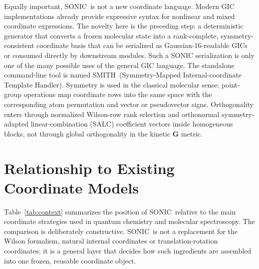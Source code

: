 \documentclass[journal=jctcce,manuscript=article,layout=traditional]{achemso}
\newcommand{\SONIC}{SONIC}
\newcommand{\SMITH}{\textsc{SMITH}}
\newcommand{\Gmat}{\mathbf{G}}
\theoremstyle{definition}
\begin{document}
Equally important, \SONIC\ is not a new coordinate language.  Modern GIC
implementations already provide expressive syntax for nonlinear and mixed
coordinate expressions.  The novelty here is the preceding step: a
deterministic generator that converts a frozen molecular state into a
rank-complete, symmetry-consistent coordinate basis that can be serialized as
Gaussian-16-readable GICs or consumed directly by downstream modules.  Such a
SONIC serialization is only one of the many possible uses of the general GIC
language.  The
standalone command-line tool is named \SMITH\ (Symmetry-Mapped
Internal-coordinate Template Handler).  Symmetry is used in the classical molecular sense: point-group
operations map coordinate rows into the same space with the corresponding atom
permutation and vector or pseudovector signs.  Orthogonality enters through
normalized Wilson-row rank selection and orthonormal symmetry-adapted
linear-combination (SALC) coefficient vectors
inside homogeneous blocks, not through global orthogonality in the kinetic
\(\Gmat\) metric.

\section{Relationship to Existing Coordinate Models}

Table~\ref{tab:context} summarizes the position of \SONIC\ relative to the main
coordinate strategies used in quantum chemistry and molecular spectroscopy.
The comparison is deliberately constructive.  \SONIC\ is not a replacement for
the Wilson formalism, natural internal coordinates or translation-rotation
coordinates; it is a general layer that decides how such ingredients are
assembled into one frozen, reusable coordinate object.
\end{document}
